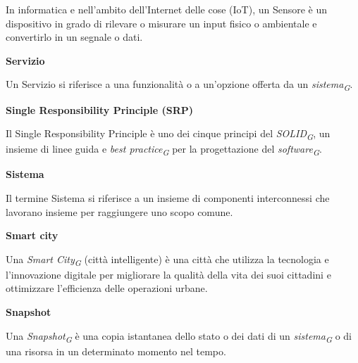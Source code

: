 \documentclass{article}
\begin{document}
In informatica e nell'ambito dell'Internet delle cose (IoT), un Sensore è un dispositivo in grado di rilevare o misurare un input fisico o ambientale e convertirlo in un segnale o dati.

\vspace{0.4cm}

\textbf{Servizio}

\vspace{0.1cm}

Un Servizio si riferisce a una funzionalità o a un'opzione offerta da un \textit{sistema}\textsubscript{\textit{G}}.

\vspace{0.4cm}

\textbf{Single Responsibility Principle (SRP)}

\vspace{0.1cm}

Il Single Responsibility Principle è uno dei cinque principi del \textit{SOLID}\textsubscript{\textit{G}}, un insieme di linee guida e \textit{best practice}\textsubscript{\textit{G}} per la progettazione del \textit{software}\textsubscript{\textit{G}}.

\vspace{0.4cm}

\textbf{Sistema}

\vspace{0.1cm}

Il termine Sistema si riferisce a un insieme di componenti interconnessi che lavorano insieme per raggiungere uno scopo comune.

\vspace{0.4cm}

\textbf{Smart city}

\vspace{0.1cm}

Una \textit{Smart City}\textsubscript{\textit{G}} (città intelligente) è una città che utilizza la tecnologia e l'innovazione digitale per migliorare la qualità della vita dei suoi cittadini e ottimizzare l'efficienza delle operazioni urbane.

\vspace{0.4cm}

\textbf{Snapshot}

\vspace{0.1cm}

Una \textit{Snapshot}\textsubscript{\textit{G}} è una copia istantanea dello stato o dei dati di un \textit{sistema}\textsubscript{\textit{G}} o di una risorsa in un determinato momento nel tempo. 
\end{document}
